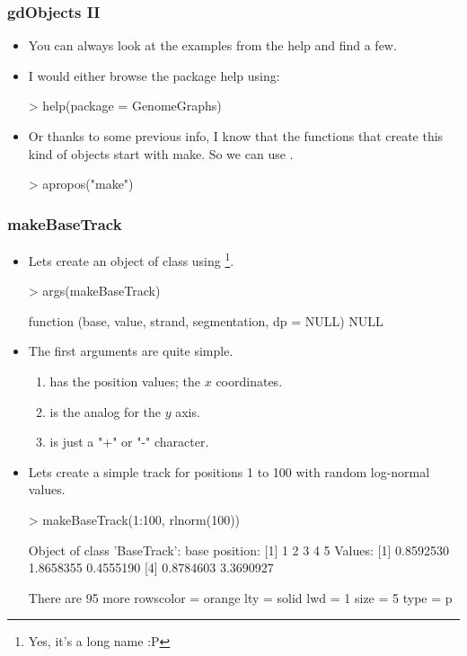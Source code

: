\begin{frame}
  \frametitle{gdObjects II}
  \begin{itemize}
  \item You can always look at the examples from the  help and find a few.
  \item I would either browse the package help using:
\begin{Schunk}
\begin{Sinput}
> help(package = GenomeGraphs)
\end{Sinput}
\end{Schunk}
  \item Or thanks to some previous info, I know that the functions that create this kind of objects start with \alert{make}. So we can use .
\begin{Schunk}
\begin{Sinput}
> apropos("make")
\end{Sinput}
\end{Schunk}
  \end{itemize}
\end{frame}

\begin{frame}
  \frametitle{makeBaseTrack}
  \begin{itemize}
  \item Lets create an object of class  using \footnote{Yes, it's a long name :P}. \scriptsize
\begin{Schunk}
\begin{Sinput}
> args(makeBaseTrack)
\end{Sinput}
\begin{Soutput}
function (base, value, strand, segmentation, dp = NULL) 
NULL
\end{Soutput}
\end{Schunk}
\normalsize
  \item The first arguments are quite simple.
  \begin{enumerate}
  \item {} has the position values; the $x$ coordinates.
  \item {} is the analog for the $y$ axis.
  \item {} is just a "+" or "-" character.
  \end{enumerate}
  \item Lets create a simple track for positions 1 to 100 with random log-normal values.
\begin{Schunk}
\begin{Sinput}
> makeBaseTrack(1:100, rlnorm(100))
\end{Sinput}
\begin{Soutput}
Object of class 'BaseTrack':
 base position: 
[1] 1 2 3 4 5
Values: 
[1] 0.8592530 1.8658355 0.4555190
[4] 0.8784603 3.3690927

 There are 95 more rowscolor  =  orange 
lty  =  solid 
lwd  =  1 
size  =  5 
type  =  p 
\end{Soutput}
\end{Schunk}
  \end{itemize}
\end{frame}

